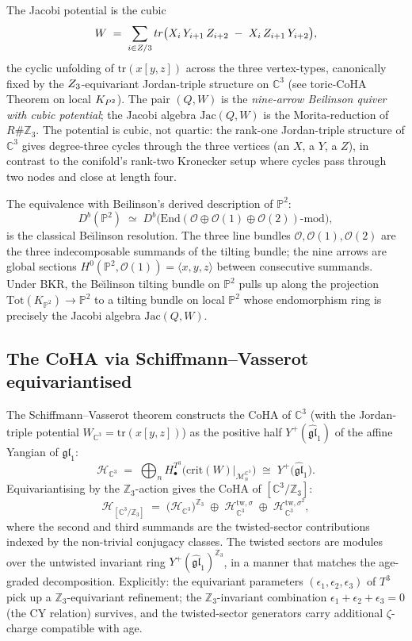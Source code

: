 The Jacobi potential is the cubic
\[
W \;=\; \sum_{i \in Z/3} tr\bigl(X_i \, Y_{i+1} \, Z_{i+2} \;-\; X_i \, Z_{i+1} \, Y_{i+2}\bigr),
\]
the cyclic unfolding of $\mathrm{tr}(x [y, z])$ across the three vertex-types, canonically fixed by the $Z_3$-equivariant Jordan-triple structure on $\mathbb{C}^3$ (see toric-CoHA Theorem on local $K_{P^2}$). The pair $(Q, W)$ is the \emph{nine-arrow Beilinson quiver with cubic potential}; the Jacobi algebra $\mathrm{Jac}(Q, W)$ is the Morita-reduction of $R \# \mathbb{Z}_3$. The potential is cubic, not quartic: the rank-one Jordan-triple structure of $\mathbb{C}^3$ gives degree-three cycles through the three vertices (an $X$, a $Y$, a $Z$), in contrast to the conifold's rank-two Kronecker setup where cycles pass through two nodes and close at length four.

The equivalence with Beilinson's derived description of $\mathbb{P}^2$:
\[
D^b(\mathbb{P}^2) \;\simeq\; D^b\bigl(\mathrm{End}(\mathcal{O} \oplus \mathcal{O}(1) \oplus \mathcal{O}(2))\text{-mod}\bigr),
\]
is the classical Be\u{\i}linson resolution. The three line bundles $\mathcal{O}, \mathcal{O}(1), \mathcal{O}(2)$ are the three indecomposable summands of the tilting bundle; the nine arrows are global sections $H^0(\mathbb{P}^2, \mathcal{O}(1)) = \langle x, y, z\rangle$ between consecutive summands. Under BKR, the Be\u{\i}linson tilting bundle on $\mathbb{P}^2$ pulls up along the projection $\mathrm{Tot}(K_{\mathbb{P}^2}) \to \mathbb{P}^2$ to a tilting bundle on local $\mathbb{P}^2$ whose endomorphism ring is precisely the Jacobi algebra $\mathrm{Jac}(Q, W)$.

\subsection{The CoHA via Schiffmann--Vasserot equivariantised}
\label{subsec:SV-equivariantised}

The Schiffmann--Vasserot theorem constructs the CoHA of $\mathbb{C}^3$ (with the Jordan-triple potential $W_{\mathbb{C}^3} = \mathrm{tr}(x[y,z])$) as the positive half $Y^+(\widehat{\mathfrak{gl}}_1)$ of the affine Yangian of $\mathfrak{gl}_1$:
\[
\mathcal{H}_{\mathbb{C}^3} \;=\; \bigoplus_n H^{T^3}_\bullet\bigl(\mathrm{crit}(W)|_{\mathcal{M}_n^{\mathbb{C}^3}}\bigr) \;\cong\; Y^+\bigl(\widehat{\mathfrak{gl}}_1\bigr).
\]
Equivariantising by the $\mathbb{Z}_3$-action gives the CoHA of $[\mathbb{C}^3/\mathbb{Z}_3]$:
\[
\mathcal{H}_{[\mathbb{C}^3/\mathbb{Z}_3]} \;=\; \bigl(\mathcal{H}_{\mathbb{C}^3}\bigr)^{\mathbb{Z}_3} \;\oplus\; \mathcal{H}_{\mathbb{C}^3}^{\mathrm{tw}, \sigma} \;\oplus\; \mathcal{H}_{\mathbb{C}^3}^{\mathrm{tw}, \sigma^2},
\]
where the second and third summands are the twisted-sector contributions indexed by the non-trivial conjugacy classes. The twisted sectors are modules over the untwisted invariant ring $Y^+(\widehat{\mathfrak{gl}}_1)^{\mathbb{Z}_3}$, in a manner that matches the age-graded decomposition. Explicitly: the equivariant parameters $(\epsilon_1, \epsilon_2, \epsilon_3)$ of $T^3$ pick up a $\mathbb{Z}_3$-equivariant refinement; the $\mathbb{Z}_3$-invariant combination $\epsilon_1 + \epsilon_2 + \epsilon_3 = 0$ (the CY relation) survives, and the twisted-sector generators carry additional $\zeta$-charge compatible with age.

